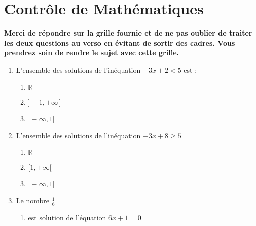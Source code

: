 \documentclass[oneside,twocolumn,landscape]{book}
\begin{document}
\section*{Contrôle de Mathématiques}

\let\MauvaiseReponse\null
\let\BonneReponse\null

{\bf Merci de répondre sur la grille fournie et de ne pas oublier de traiter les deux questions au verso en évitant de sortir des cadres. Vous prendrez soin de rendre le sujet avec cette grille.}
\vspace{2em}







\begin{enumerate}




\item L'ensemble des solutions de l'inéquation $-3 x+2<5$ est :

\begin{enumerate}

\item\MauvaiseReponse $\mathbb{R}$

\item\BonneReponse $]-1,+\infty[$

\item\MauvaiseReponse $]-\infty, 1]$

\end{enumerate}

\item L'ensemble des solutions de l'inéquation $-3x+8 \geqslant 5$

\begin{enumerate}

\item\MauvaiseReponse $\mathbb{R}$

\item\MauvaiseReponse $[1,+\infty[$

\item\BonneReponse $]-\infty,1]$

\end{enumerate}





\item Le nombre $\frac{1}{6}$

\begin{enumerate}

\item\MauvaiseReponse est solution de l'équation $6x+1=0$


\end{enumerate}
\end{enumerate}
\end{document}
